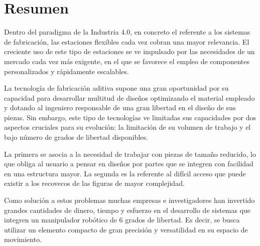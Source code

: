 \newpage

\chapter*{Resumen}  %

Dentro del paradigma de la Industria 4.0, en concreto el referente a los sistemas de fabricación, las estaciones flexibles cada vez cobran una mayor relevancia. El creciente uso de este tipo de estaciones se ve impulsado por las necesidades de un mercado cada vez más exigente, en el que se favorece el empleo de componentes personalizados y rápidamente escalables.

La tecnología de fabricación aditiva supone una gran oportunidad por su capacidad para desarrollar multitud de diseños optimizando el material empleado y dotando al ingeniero responsable de una gran libertad en el diseño de sus piezas. Sin embargo, este tipo de tecnologías ve limitadas sus capacidades por dos aspectos cruciales para su evolución: la limitación de su volumen de trabajo y el bajo número de grados de libertad disponibles.

La primera se asocia a la necesidad de trabajar con piezas de tamaño reducido, lo que obliga al usuario a pensar en diseños por partes que se integren con facilidad en una estructura mayor. La segunda es la referente al difícil acceso que puede existir a los recovecos de las figuras de mayor complejidad. 

Como solución a estos problemas muchas empresas e investigadores han invertido grandes cantidades de dinero, tiempo y esfuerzo en el desarrollo de sistemas que integren un manipulador robótico de 6 grados de libertad. Es decir, se busca utilizar un elemento compacto de gran precisión y versatilidad en su espacio de movimiento.

